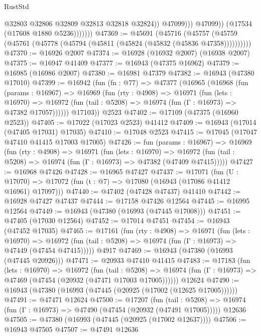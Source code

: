 \begin{lexlean}{RustStd}
\begin{coremodule}
                            @32803
                            @32806
                            @32809
                            @32813
                            @32818
                            @32824))
                        @47099)))
                  @47099))
              (@17534 (@17608 @1880 @5236)))))))
@47369 := @45691
    (@45716 (@45757 (@45759 (@45761 (@45778 (@45794 (@45811 (@45824 (@45832 (@45836 @47358))))))))))
@47370 := @16926 @2007
@47374 := @16928 (@16932 @2007) (@16938 @2007)
@47375 := @16947 @41409
@47377 := @16943 (@47375 @16962)
@47379 := @16985 (@16986 @2007)
@47380 := @16981 @47379
@47382 := @16943 (@47380 @17010)
@47399 := @16942
    (fun (fn : @77) =>
    @47377
      (@16965
        (@16968
          (fun (params : @16967) =>
          @16969
            (fun (rty : @4908) =>
            @16971
              (fun (lets : @16970) =>
              @16972 (fun (tail : @5208) => @16974 (fun (Γ : @16973) => @47382 @17057))))))
        @17103))
    @2523
@47402 := @17109 (@47375 (@16960 @2523))
@47405 := @17022 (@17023 @2523) @41412
@47409 := @16943 (@17014 (@47405 @17031) @17035)
@47410 := @17048 @2523
@47415 := @17045 (@17047 @47410 @41415 @17003 @17005)
@47426 := fun (params : @16967) =>
  @16969
    (fun (rty : @4908) =>
    @16971
      (fun (lets : @16970) =>
      @16972 (fun (tail : @5208) => @16974 (fun (Γ : @16973) => @47382 (@47409 @47415)))))
@47427 := @16968 @47426
@47428 := @16965 @47427
@47437 := @17071
    (fun (U : @17070) => @17072 (fun (t : @7) => @17080 (@16943 (@17086 @41412 @16961) @17097)))
@47440 := @47402 (@47428 @47437) @41410
@47442 := @16928 @47427 @47437
@47444 := @17158 @47426 @12564
@47445 := @16995 @12564
@47449 := @16943 (@47380 (@16993 (@47445 @17008)))
@47451 := @47405 (@17030 @12564)
@47452 := @17014 @47451
@47454 := @16943 (@47452 @17035)
@47465 := @17161
    (fun (rty : @4908) =>
    @16971
      (fun (lets : @16970) =>
      @16972 (fun (tail : @5208) => @16974 (fun (Γ : @16973) => @47449 (@47454 @47415)))))
    @4917
@47469 := @16943 (@47380 (@16993 (@47445 @20926)))
@47471 := @20933 @47410 @41415
@47483 := @17183
    (fun (lets : @16970) =>
    @16972
      (fun (tail : @5208) =>
      @16974 (fun (Γ : @16973) => @47469 (@47454 (@20932 (@47471 @17003 @17005))))))
    @12624
@47490 := @16943 (@47380 (@16993 (@47445 (@20925 (@17002 (@12625 @17005))))))
@47491 := @47471 @12624
@47500 := @17207
    (fun (tail : @5208) => @16974 (fun (Γ : @16973) => @47490 (@47454 (@20932 (@47491 @17005)))))
    @12636
@47505 := @47380 (@16993 (@47445 (@20925 (@17002 @12637))))
@47506 := @16943 @47505
@47507 := @47491 @12636

\end{coremodule}
\end{lexlean}
